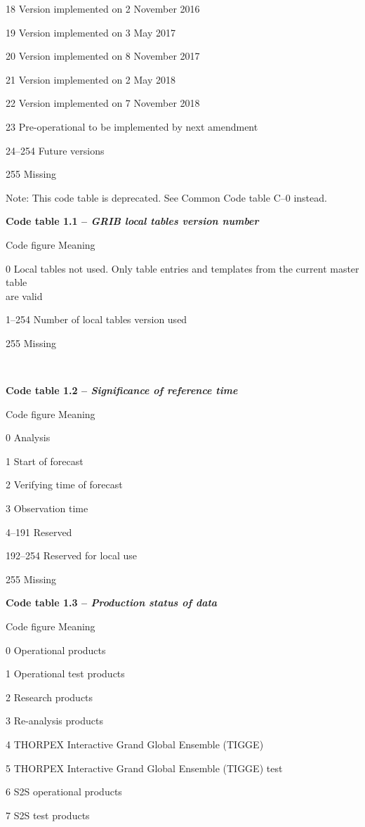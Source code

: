 18 Version implemented on 2 November 2016

19 Version implemented on 3 May 2017

20 Version implemented on 8 November 2017

21 Version implemented on 2 May 2018

22 Version implemented on 7 November 2018

23 Pre-operational to be implemented by next amendment

24--254 Future versions

255 Missing

Note: This code table is deprecated. See Common Code table C--0 instead.

\textbf{Code table 1.1 -- \emph{GRIB local tables version number}}

Code figure Meaning

0 Local tables not used. Only table entries and templates from the current master table\\
are valid

1--254 Number of local tables version used

255 Missing

\textbf{\\
}

\textbf{Code table 1.2 -- \emph{Significance of reference time}}

Code figure Meaning

0 Analysis

1 Start of forecast

2 Verifying time of forecast

3 Observation time

4--191 Reserved

192--254 Reserved for local use

255 Missing

\textbf{Code table 1.3 -- \emph{Production status of data}}

Code figure Meaning

0 Operational products

1 Operational test products

2 Research products

3 Re-analysis products

4 THORPEX Interactive Grand Global Ensemble (TIGGE)

5 THORPEX Interactive Grand Global Ensemble (TIGGE) test

6 S2S operational products

7 S2S test products

